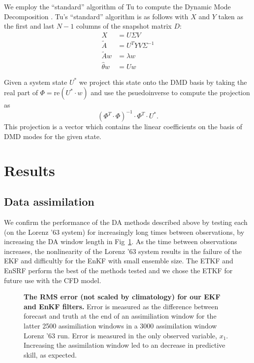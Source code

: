 \documentclass[10pt,letterpaper]{article}
\begin{document}
We employ the ``standard'' algorithm of Tu to compute the Dynamic Mode Decomposition \cite{tu2013dynamic}.
Tu's ``standard'' algorithm is as follows with $X$ and $Y$ taken as the first and last $N-1$ columns of the snapshot matrix $D$:
\begin{align*} X &= U\Sigma V \tag*{(Take SVD of $X$.)}\\
  \tilde{A} &= U^T Y V \Sigma ^{-1} \tag*{(Build the $A$ matrix.)}\\
  \tilde{A}w &= \lambda w \tag*{(Compute eigenvectors and values.)}\\
  \hat{\theta}w &= U w \tag*{(Compute corresponding modes.)}\end{align*}

Given a system state $U^*$ we project this state onto the DMD basis by taking the real part of $\Phi = \text{re}\left (U^*\cdot w\right)$ and use the psuedoinverse to compute the projection as $$(\Phi^T \cdot \Phi)^{-1} \cdot \Phi ^T \cdot U^*.$$
This projection is a vector which contains the linear coefficients on the basis of DMD modes for the given state.

\section*{Results}

\subsection*{Data assimilation}
\label{data_assimilation_section}

We confirm the performance of the DA methods described above by testing each (on the Lorenz '63 system) for increasingly long times between observations, by increasing the DA window length in Fig~\ref{fig:window_test}.
As the time between observations increases, the nonlinearity of the Lorenz '63 system results in the failure of the EKF and difficultly for the EnKF with small ensemble size.
The ETKF and EnSRF perform the best of the methods tested and we chose the ETKF for future use with the CFD model.

\begin{figure}[h]
  \centering
  \caption[The RMS error is reported for our EKF and EnKF filters]{
\textbf{    The RMS error (not scaled by climatology) for our EKF and EnKF filters.
}    Error is measured as the difference between forecast and truth at the end of an assimiliation window for the latter 2500 assimiliation windows in a 3000 assimilation window Lorenz '63 run.
    Error is measured in the only observed variable, $x_1$.
    Increasing the assimilation window led to an decrease in predictive skill, as expected.
  }
  \label{fig:window_test}
\end{figure}
\end{document}
